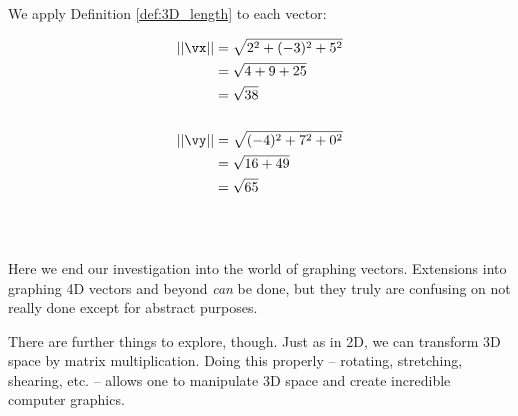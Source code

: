 {We apply Definition \ref{def:3D_length} to each vector:

\begin{align*}
||\vx|| 	&= \sqrt{2^2 + (-3)^2 + 5^2} \\
					&= \sqrt{4 + 9 + 25}\\
					&= \sqrt{38}\\
\\
||\vy|| &= \sqrt{(-4)^2 + 7^2 + 0^2}\\
				&= \sqrt{16+49}\\
				&= \sqrt{65}
\end{align*}
\ } \\ %

Here we end our investigation into the world of graphing vectors. Extensions into graphing 4D vectors and beyond \textit{can} be done, but they truly are confusing on not really done except for abstract purposes. 

There are further things to explore, though. Just as in 2D, we can transform 3D space by matrix multiplication. Doing this properly -- rotating, stretching, shearing, etc. -- allows one to manipulate 3D space and create incredible computer graphics. \\


